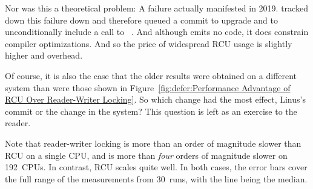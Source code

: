 {{	Nor was this a theoretical problem:
	A failure actually manifested in 2019.
	 tracked down this failure down and
	therefore queued a commit to upgrade  and
	 to unconditionally include a call to
	~\cite{LinusTorvalds2019:RCUreader.barrier}.
	And although  emits no code, it does constrain
	compiler optimizations.
	And so the price of widespread RCU usage is slightly higher
	 and  overhead.

	Of course, it is also the case that the older results were obtained
	on a different system than were those shown in
	Figure~\ref{fig:defer:Performance Advantage of RCU Over Reader-Writer Locking}.
	So which change had the most effect, Linus's commit or the change in
	the system?
	This question is left as an exercise to the reader.
}\QuickQuizEndM

\QuickQuizEndE
}                 %

Note that reader-writer locking is more than an order of magnitude slower
than RCU on a single CPU, and is more than \emph{four} orders of magnitude
slower on 192~CPUs.
In contrast, RCU scales quite well.
In both cases, the error bars cover the full range of the measurements
from 30~runs, with the line being the median.

